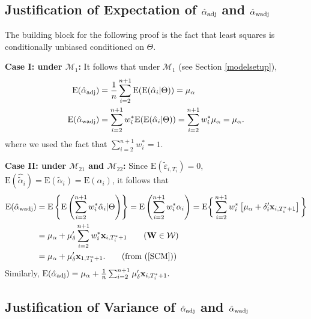\documentclass[11pt,3p,review,authoryear]{elsarticle}
\def\mbf#1{\mathbf{#1}} %
\def\mrm#1{\mathrm{#1}} %
\def\mc#1{\mathcal{#1}} %
\def\E#1{\mathrm{E}(#1)} %
\theoremstyle{definition}
\begin{document}
\subsection{Justification of Expectation of $\hat{\alpha}_{\rm adj}$ and $\hat{\alpha}_{\rm wadj}$}
\label{exp}

The building block for the following proof is the fact that least squares is conditionally unbiased conditioned on $\Theta$. 

\noindent \textbf{Case I: under $\mc{M}_{1}$:} It follows that  under $\mc{M}_{1}$ (see Section \ref{modelsetup}),
\begin{align*}
\E{\hat{\alpha}_{\rm adj}} &=\frac{1}{n}  \sum_{i=2}^{n+1} \E{\E{\hat{\alpha}_i|\Theta}} = \mu_{\alpha} \\
 \E{\hat{\alpha}_{\rm wadj}}&= \sum_{i=2}^{n+1} w_i^* \E{\E{\hat{\alpha}_i|\Theta}}= \sum_{i=2}^{n+1} w_i^*\mu_{\alpha}= \mu_{\alpha}.
\end{align*}
where we used the fact that $\sum_{i=2}^{n+1} w^*_i=1$. 

\noindent \textbf{Case II: under $\mc{M}_{21}$ and $\mc{M}_{22}$:} Since $\E{\tilde{\varepsilon}_{i, T_i}}=0$, $\E{\hat{\tilde{\alpha}}_{i}}=\E{\tilde{\alpha}_{i}}=\E{\alpha_{i}}$, it follows that
  \begin{align*}
   \E{\hat{\alpha}_{\rm wadj}}
   &= \mrm{E}\left\{\mrm{E}\left(\sum_{i=2}^{n+1} w_i^*\hat{\alpha}_i|\Theta\right)\right\}
   = \mrm{E}\left( \sum_{i=2}^{n+1} w_i^*\alpha_i\right) 
   = \mrm{E}\bigg\{ \sum_{i=2}^{n+1} w_i^*\left[\mu_{\alpha}+\delta_{i}'\mbf{x}_{i, T_i^*+1}\right]\bigg\} \\
   &=\mu_{\alpha}+ \mu_{\delta}' \sum_{i=2}^{n+1} w_i^*\mbf{x}_{i, T_i^*+1}\tag{$\mbf{W}\in \mc{W}$}
   \\
   &=\mu_{\alpha}+  \mu_{\delta}'\mbf{x}_{1, T_1^*+1}. \tag{from (\ref{SCM})}
   \end{align*}
Similarly,
$
   \E{\hat{\alpha}_{\rm adj}}
   =\mu_{\alpha}+\frac{1}{n}\sum_{i=2}^{n+1} \mu_{\delta}'  \mbf{x}_{i, T_i^*+1}.
$


\subsection{Justification of Variance of $\hat{\alpha}_{\rm adj}$ and $\hat{\alpha}_{\rm wadj}$}
\label{var}
\end{document}
